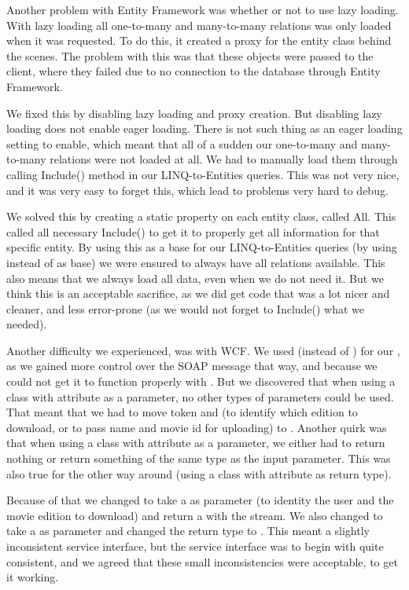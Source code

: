Another problem with Entity Framework was whether or not to use lazy loading. With lazy loading all one-to-many and many-to-many relations was only loaded when it was requested. To do this, it created a proxy for the entity class behind the scenes. The problem with this was that these objects were passed to the client, where they failed due to no connection to the database through Entity Framework.

We fixed this by disabling lazy loading and proxy creation. But disabling lazy loading does not enable eager loading. There is not such thing as an eager loading setting to enable, which meant that all of a sudden our one-to-many and many-to-many relations were not loaded at all. We had to manually load them through calling Include() method in our LINQ-to-Entities queries. This was not very nice, and it was very easy to forget this, which lead to problems very hard to debug.

We solved this by creating a static property on each entity class, called All. This called all necessary Include() to get it to properly get all information for that specific entity. By using this as a base for our LINQ-to-Entities queries (by using  instead of  as base) we were ensured to always have all relations available. This also means that we always load all data, even when we do not need it. But we think this is an acceptable sacrifice, as we did get code that was a lot nicer and cleaner, and less error-prone (as we would not forget to Include() what we needed).

Another difficulty we experienced, was with WCF. We used  (instead of ) for our , as we gained more control over the SOAP message that way, and because we could not get it to function properly with . But we discovered that when using a class with  attribute as a parameter, no other types of parameters could be used. That meant that we had to move token and  (to identify which edition to download, or to pass name and movie id for uploading) to . Another quirk was that when using a class with  attribute as a parameter, we either had to return nothing or return something of the same type as the input parameter. This was also true for the other way around (using a class with  attribute as return type).

Because of that we changed  to take a   as parameter (to identity the user and the movie edition to download) and return a   with the stream. We also changed  to take a  as parameter and changed the return type to . This meant a slightly inconsistent service interface, but the service interface was to begin with quite consistent, and we agreed that these small inconsistencies were acceptable, to get it working.